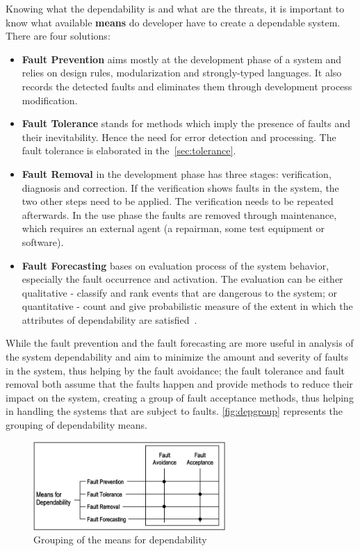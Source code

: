 Knowing what the dependability is and what are the threats, it is important to know what available \textbf{means} do developer have to create a dependable system. There are four solutions:
\begin{itemize}
    \item \textbf{Fault Prevention} aims mostly at the development phase of a system and relies on design rules, modularization and strongly-typed languages. It also records the detected faults and eliminates them through development process modification.
    \item \textbf{Fault Tolerance} stands for methods which imply the presence of faults and their inevitability. Hence the need for error detection and processing. The fault tolerance is elaborated in the~\autoref{sec:tolerance}.
    \item \textbf{Fault Removal} in the development phase has three stages: verification, diagnosis and correction. If the verification shows faults in the system, the two other steps need to be applied. The verification needs to be repeated afterwards. In the use phase the faults are removed through maintenance, which requires an external agent (a repairman, some test equipment or software).
    \item \textbf{Fault Forecasting} bases on evaluation process of the system behavior, especially the fault occurrence and activation. The evaluation can be either qualitative - classify and rank events that are dangerous to the system; or quantitative - count and give probabilistic measure of the extent in which the attributes of dependability are satisfied~\cite{art:Avizienis, art:Avizienis2}. 
\end{itemize}
While the fault prevention and the fault forecasting are more useful in analysis of the system dependability and aim to minimize the amount and severity of faults in the system, thus helping by the fault avoidance; the fault tolerance and fault removal both assume that the faults happen and provide methods to reduce their impact on the system, creating a group of fault acceptance methods, thus helping in handling the systems that are subject to faults. \autoref{fig:depgroup} represents the grouping of dependability means.

\begin{figure}[H]
\centering
\includegraphics[width=0.65\textwidth]{figures/depgroup.png}
\caption{Grouping of the means for dependability~\cite{art:Avizienis}}
\label{fig:depgroup}
\end{figure}


